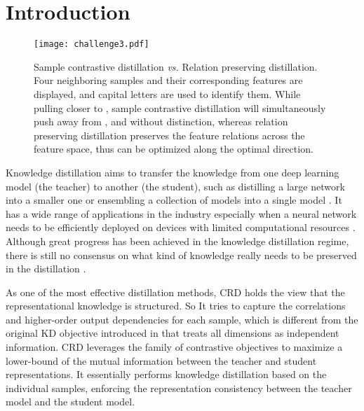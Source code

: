 \documentclass[final]{cvpr}
\begin{document}
\section{Introduction}
\begin{figure}[t]
\begin{center}
    \texttt{[image: challenge3.pdf]}
    \caption{ Sample contrastive distillation \textit{vs.} Relation preserving distillation. 
    Four neighboring samples and their corresponding features are displayed, and 
    capital letters are used to identify them.
    While pulling   closer to ,  sample contrastive distillation  will simultaneously push  away from ,  and  without distinction,
    whereas relation preserving distillation preserves the feature relations across the feature space, thus  can be optimized along the optimal direction.
    }
    \label{fig:challenge}
\end{center}
\vspace{-1.8em}
\end{figure}



Knowledge distillation aims to transfer the knowledge from one deep learning model (the teacher) to another (the student), such as distilling a large network into a smaller one \cite{hinton2015distilling,yim2017gift,belagiannis2018adversarial,xu2017training,ge2020mutual} or ensembling a collection of models into a single model \cite{malinin2019ensemble,shen2019meal,liu2019knowledge,wu2019distilled}.  It has a wide range of applications in the industry especially when a neural network needs to be efficiently deployed on devices with limited computational resources \cite{chen2020big,crowded,MutualCRF}.  Although great progress has been achieved in the knowledge distillation regime, there is still no consensus on what kind of knowledge really needs to be preserved in the distillation \cite{gou2020knowledge}. 


As one of the most effective distillation methods, CRD \cite{crd} holds the view that the representational knowledge is structured. So It tries to capture the correlations and higher-order output dependencies for each sample, which is different from the original KD objective introduced in \cite{hinton2015distilling} that treats all dimensions as independent information. CRD leverages the family of contrastive objectives \cite{DeepInfoMAx,Contrastive_multiview_coding, wu2018unsupervised, caron2020unsupervised} to maximize a lower-bound of the mutual information between the teacher and student representations. It essentially performs knowledge distillation based on the individual samples, enforcing the representation consistency between the teacher model and the student model. 
\end{document}
